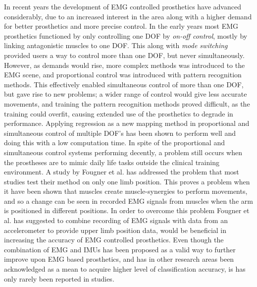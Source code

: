 In recent years the development of EMG controlled prosthetics have advanced considerably, due to an increased interest in the area along with a higher demand for better prosthetics and more precise control. \cite{Fougner2012} In the early years most EMG prosthetics functioned by only controlling one DOF by \textit{on-off control}, mostly by linking antagonistic muscles to one DOF. This along with \textit{mode switching} provided users a way to control more than one DOF, but never simultaneously. However, as demands would rise, more complex methods was introduced to the EMG scene, and proportional control was introduced with pattern recognition methods. This effectively enabled simultaneous control of more than one DOF, but gave rise to new problems; a wider range of control would give less accurate movements, and training the pattern recognition methods proved difficult, as the training could overfit, causing extended use of the prosthetics to degrade in performance. \cite{Ison2016} 
Applying regression as a new mapping method in proportional and simultaneous control of multiple DOF's has been shown to perform well and doing this with a low computation time. \cite{hahne2014} In spite of the proportional and simultaneous control systems performing decently, a problem still occurs when the prostheses are to mimic daily life tasks outside the clinical training environment. \cite{jiang2012}
A study by Fougner et al. \cite{Fougner2011} has addressed the problem that most studies test their method on only one limb position.
This proves a problem when it have been shown that muscles create muscle-synergies to perform movements, and so a change can be seen in recorded EMG signals from muscles when the arm is positioned in different positions. \cite{Fougner2011, avella2006, DeRugy2013} 
In order to overcome this problem Fougner et al. \cite{Fougner2011} has suggested to combine recording of EMG signals with data from an accelerometer to provide upper limb position data, would be beneficial in increasing the accuracy of EMG controlled prosthetics. Even though the combination of EMG and IMUs has been proposed as a valid way to further improve upon EMG based prosthetics, and has in other research areas been acknowledged as a mean to acquire higher level of classification accuracy, is has only rarely been reported in studies. \cite{Roy2010, Imtiaz2014, jiang2012}
